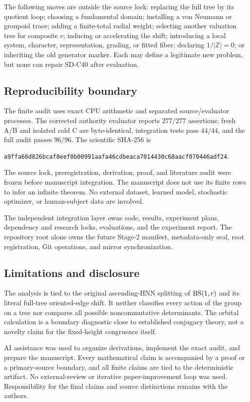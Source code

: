 The following moves are outside the source lock: replacing the full tree by
its quotient loop; choosing a fundamental domain; installing a von Neumann
or groupoid trace; adding a finite-total radial weight; selecting another
valuation tree for composite $r$; inducing or accelerating the shift;
introducing a local system, character, representation, grading, or fitted
fiber; declaring $1/|\mathbb Z|=0$; or inheriting the old generator marker.
Each may define a legitimate new problem, but none can repair SD-C40 after
evaluation.

\subsection{Reproducibility boundary}

The finite audit uses exact CPU arithmetic and separated source/evaluator
processes.  The corrected authority evaluator reports $277/277$ assertions;
fresh A/B and isolated cold C are byte-identical, integration tests pass
$44/44$, and the full audit passes $96/96$.  The scientific SHA-256 is
\begin{center}
\small\nolinkurl{a9ffa66d826bcaf8eef0b00991aafa46cdbeaca7014430c68aacf070446adf24}.
\end{center}
The source lock, preregistration, derivation, proof, and literature audit were
frozen before manuscript integration.  The manuscript does not use its
finite rows to infer an infinite theorem.  No external dataset, learned
model, stochastic optimizer, or human-subject data are involved.

The independent integration layer owns code, results, experiment plans,
dependency and research locks, evaluations, and the experiment report.  The
repository root alone owns the future Stage-2 manifest, metadata-only seal,
root registration, Git operations, and mirror synchronization.

\subsection{Limitations and disclosure}

The analysis is tied to the original ascending-HNN splitting of
$\operatorname{BS}(1,r)$ and its literal full-tree oriented-edge shift.  It neither
classifies every action of the group on a tree nor compares all possible
noncommutative determinants.  The orbital calculation is a boundary
diagnostic close to established conjugacy theory, not a novelty claim for
the fixed-height congruence itself.

AI assistance was used to organize derivations, implement the exact audit,
and prepare the manuscript.  Every mathematical claim is accompanied by a
proof or a primary-source boundary, and all finite claims are tied to the
deterministic artifact.  No external-review or iterative paper-improvement
loop was used.  Responsibility for the final claims and source distinctions
remains with the authors.
\normalsize
